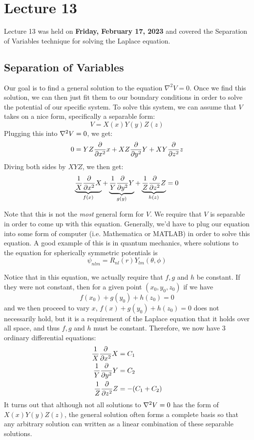 \chapter{Lecture 13}

Lecture 13  was held on \textbf{Friday, February 17, 2023}  and covered the Separation of Variables technique for
solving the Laplace equation.

\section{Separation of Variables}

Our goal is to find a general solution to the equation $\nabla^2 V = 0$. Once we find this solution, we can then 
just fit them to our boundary conditions in order to solve the potential of our specific system. To solve this 
system, we can assume that $V$ takes on a nice form, specifically a separable form:
\[ V = X(x) Y(y) Z(z)\]
Plugging this into $\nabla^2 V =0$, we get:
\[ 0 = YZ \pdv{x^2} x + XZ \pdv{y^2} Y + XY \pdv{z^2}z\]
Diving both sides by $XYZ$, we then get: 
\[ \underbrace{\frac{1}{X}\pdv{x^2} X}_{f(x)} + \underbrace{\frac{1}{Y}\pdv{y^2}Y}_{g(y)} +
\underbrace{\frac{1}{Z}\pdv{z^2} Z}_{h(z)} = 0\]
\begin{insight*}{}{}
		Note that this is not the \textit{most} general form for $V$. We require that $V$ is separable in order to
		come up with this equation. Generally, we'd have to plug our equation into some form of computer 
		(i.e. Mathematica or MATLAB) in order to solve this equation. A good example of this is in quantum 
		mechanics, where solutions to the \schrodinger equation for spherically symmetric potentials is 
		\[ \psi_{nlm} = R_{nl}(r) Y_{lm}(\theta, \phi)\]
\end{insight*}
Notice that in this equation, we actually require that $f, g$ and $h$ be constant. If they were not constant, 
then for a given point $(x_0, y_0, z_0)$ if we have 
\[ f(x_0) + g(y_0) + h(z_0) = 0\]
and we then proceed to vary $x$, $f(x) + g(y_0) + h(z_0) = 0$ does not necessarily hold, but it is a requirement 
of the Laplace equation that it holds over all space, and thus $f, g$ and $h$ must be constant. Therefore, we 
now have 3 ordinary differential equations: 
\begin{align*}
		\frac{1}{X}\pdv{x^2}X &= C_1\\
		\frac{1}{Y}\pdv{y^2}Y &= C_2  \\
		\frac{1}{Z}\pdv{z^2}Z &= -(C_1 + C_2)
\end{align*}
It turns out that although not all solutions to $\nabla^2 V = 0$ has the form of $X(x)Y(y)Z(z)$, the general 
solution often forms a complete basis so that any arbitrary solution can written as a linear combination of
these separable solutions. 

